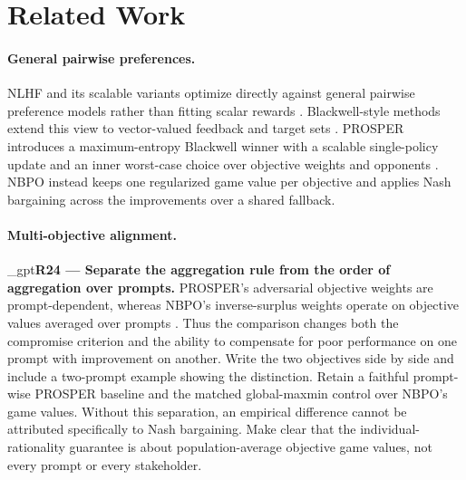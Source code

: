 \documentclass{article}
\makeatletter
\newif\ifshowreviews
\let\revieworiginalref\ref
\newcommand{\reviewref}[1]{%
  \@ifundefined{r@#1}{\textnormal{[original-draft ref.: \texttt{\detokenize{#1}}]}}%
  {\revieworiginalref{#1}}}
\let\ref\reviewref
\newcommand{\reviewresponse}[1]{%
  \ifshowreviews
  \par\begingroup\color{blue!65!black}\hypersetup{allcolors=blue!65!black}\emergencystretch=2em%
  \noindent\textbf{Response:} #1\par\endgroup
  \fi}
\theoremstyle{remark}
\theoremstyle{plain}
\newcommand{\NBPO}{\textsc{NBPO}}
\makeatother
\begin{document}
\section{Related Work}
\label{sec:related}
\paragraph{General pairwise preferences.}
NLHF and its scalable variants optimize directly against general pairwise preference models rather than fitting scalar rewards \citep{munos2024nash,wu2025sppo,zhang2025iterative,calandriello2024online,rosset2024direct,zhou2025egpo}. Blackwell-style methods extend this view to vector-valued feedback and target sets \citep{blackwell1956analog,bhatia2020multicriteria}. PROSPER introduces a maximum-entropy Blackwell winner with a scalable single-policy update and an inner worst-case choice over objective weights and opponents \citep{zhang2026prosper}. \NBPO{} instead keeps one regularized game value per objective and applies Nash bargaining across the improvements over a shared fallback.

\paragraph{Multi-objective alignment.}

\kekim_gpt{\textbf{R24 --- Separate the aggregation rule from the order of aggregation over prompts.} PROSPER's adversarial objective weights are prompt-dependent, whereas NBPO's inverse-surplus weights operate on objective values averaged over prompts \citep{zhang2026prosper}. Thus the comparison changes both the compromise criterion and the ability to compensate for poor performance on one prompt with improvement on another. Write the two objectives side by side and include a two-prompt example showing the distinction. Retain a faithful prompt-wise PROSPER baseline and the matched global-maxmin control over NBPO's game values. Without this separation, an empirical difference cannot be attributed specifically to Nash bargaining. Make clear that the individual-rationality guarantee is about population-average objective game values, not every prompt or every stakeholder.}
\reviewresponse{\textbf{R24 --- Partially addressed.} The global-maxmin and prompt-wise PROSPER rows are distinguished, with the two-prompt example retained. Current policy results and seed counts are in Table~\ref{tab:uf-objectives}; the adaptation contract does not imply reproduction of every published training step. Per-prompt negative surplus is reported as a selected-policy violation, not an infeasibility certificate.}
\end{document}
